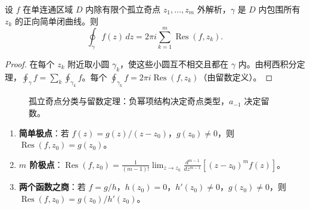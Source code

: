 \begin{theorem}[留数定理]\label{thm:residue_theorem}
设 $f$ 在单连通区域 $D$ 内除有限个孤立奇点 $z_1, \dots, z_m$ 外解析，$\gamma$ 是 $D$ 内包围所有 $z_k$ 的正向简单闭曲线。则
\[
\oint_\gamma f(z)\,dz = 2\pi i \sum_{k=1}^{m} \operatorname{Res}(f, z_k).
\]
\end{theorem}

\begin{proof}
在每个 $z_k$ 附近取小圆 $\gamma_k$，使这些小圆互不相交且都在 $\gamma$ 内。由柯西积分定理，$\oint_\gamma f = \sum_k \oint_{\gamma_k} f$。每个 $\oint_{\gamma_k} f = 2\pi i \operatorname{Res}(f, z_k)$（由留数定义）。
\end{proof}

\begin{figure}[htbp]
\centering
{}
\caption{孤立奇点分类与留数定理：负幂项结构决定奇点类型，$a_{-1}$ 决定留数。}
\label{fig:singularity_residue}
\end{figure}

\begin{example}\label{ex:residue_examples}
\begin{enumerate}[label=(\roman*)]
    \item \textbf{简单极点}：若 $f(z) = g(z)/(z-z_0)$，$g(z_0) \ne 0$，则 $\operatorname{Res}(f, z_0) = g(z_0)$。
    \item \textbf{$m$ 阶极点}：$\operatorname{Res}(f, z_0) = \frac{1}{(m-1)!} \lim_{z \to z_0} \frac{d^{m-1}}{dz^{m-1}}\left[(z-z_0)^m f(z)\right]$。
    \item \textbf{两个函数之商}：若 $f = g/h$，$h(z_0) = 0$，$h'(z_0) \ne 0$，$g(z_0) \ne 0$，则 $\operatorname{Res}(f, z_0) = g(z_0)/h'(z_0)$。
\end{enumerate}
\end{example}

